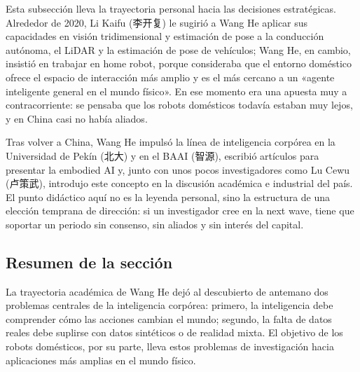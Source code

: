 Esta subsección lleva la trayectoria personal hacia las decisiones estratégicas. Alrededor de 2020, Li Kaifu (李开复) le sugirió a Wang He aplicar sus capacidades en visión tridimensional y estimación de pose a la conducción autónoma, el LiDAR y la estimación de pose de vehículos; Wang He, en cambio, insistió en trabajar en home robot, porque consideraba que el entorno doméstico ofrece el espacio de interacción más amplio y es el más cercano a un «agente inteligente general en el mundo físico». En ese momento era una apuesta muy a contracorriente: se pensaba que los robots domésticos todavía estaban muy lejos, y en China casi no había aliados.

Tras volver a China, Wang He impulsó la línea de inteligencia corpórea en la Universidad de Pekín (北大) y en el BAAI (智源), escribió artículos para presentar la embodied AI y, junto con unos pocos investigadores como Lu Cewu (卢策武), introdujo este concepto en la discusión académica e industrial del país. El punto didáctico aquí no es la leyenda personal, sino la estructura de una elección temprana de dirección: si un investigador cree en la next wave, tiene que soportar un periodo sin consenso, sin aliados y sin interés del capital.

\subsection{Resumen de la sección}

La trayectoria académica de Wang He dejó al descubierto de antemano dos problemas centrales de la inteligencia corpórea: primero, la inteligencia debe comprender cómo las acciones cambian el mundo; segundo, la falta de datos reales debe suplirse con datos sintéticos o de realidad mixta. El objetivo de los robots domésticos, por su parte, lleva estos problemas de investigación hacia aplicaciones más amplias en el mundo físico.
